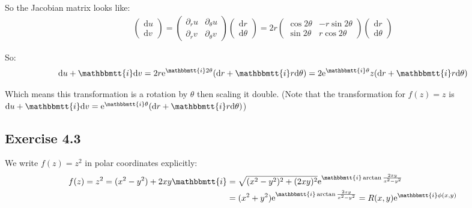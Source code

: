 \documentclass[]{ctexart}
\newcommand{\mi}{\mathbbmtt{i}}
\newcommand{\di}{\mathrm{d}}
\newcommand{\pa}{\partial}
\newcommand{\me}{\mathrm{e}}
\begin{document}
		So the Jacobian matrix looks like:
			\begin{equation*}
			\begin{aligned}
				\begin{pmatrix}
					\di u\\
					\di v
				\end{pmatrix}
				=
				\begin{pmatrix}
					\pa_ru & \pa_{\theta}u\\
					\pa_rv & \pa_{\theta}v
				\end{pmatrix}
				\begin{pmatrix}
					\di r\\
					\di \theta
				\end{pmatrix}
				=2r
				\begin{pmatrix}
					\cos 2\theta & -r\sin 2\theta\\
					\sin2 \theta & r\cos 2\theta
				\end{pmatrix}
				\begin{pmatrix}
					\di r\\
					\di \theta
				\end{pmatrix}
			\end{aligned}
			\end{equation*}
		
		So: 
			\begin{equation*}
			\begin{aligned}
				\di u+\mi \di v=2r\me ^{\mi 2\theta}(\di r+\mi r \di \theta)=2\me ^{\mi \theta}z(\di r+\mi r \di \theta)
			\end{aligned}
			\end{equation*}
		
		Which means this transformation is a rotation by $\theta$ then scaling it double. (Note that the transformation for $f(z)=z$ is $\di u+\mi \di v=\me ^{\mi \theta}(\di r+\mi r \di \theta)$)
	
	\subsection{Exercise 4.3}
		We write $f(z)=z^2$ in polar coordinates explicitly:
			\begin{equation*}
			\begin{aligned}
				f(z)=z^2=(x^2-y^2)+2xy\mi &=\sqrt{(x^2-y^2)^2+(2xy)^2}\me ^{\mi \arctan\frac{2xy}{x^2-y^2}}\\
				&=(x^2+y^2)\me ^{\mi \arctan\frac{2xy}{x^2-y^2}}=R(x,y)\me ^{\mi \phi(x,y)}
			\end{aligned}
			\end{equation*}
		
\end{document}
